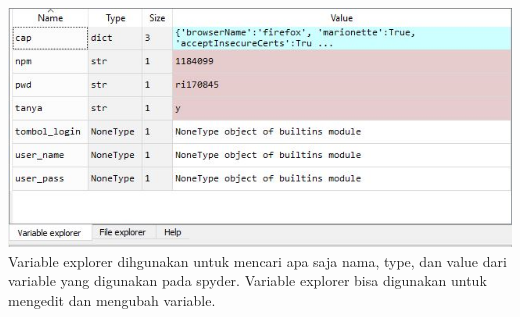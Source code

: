 \begin{enumerate}
\includegraphics{gambar/8_1.jpg}
Variable explorer dihgunakan untuk mencari apa saja nama, type, dan value dari variable yang digunakan pada spyder. Variable explorer bisa digunakan untuk mengedit dan mengubah variable.

\end{enumerate}

